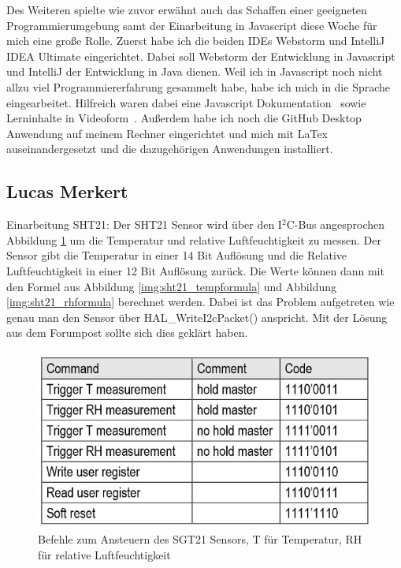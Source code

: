 \documentclass[]{article}
\begin{document}
Des Weiteren spielte wie zuvor erwähnt auch das Schaffen einer geeigneten Programmierumgebung samt der Einarbeitung in Javascript diese Woche für mich eine große Rolle. Zuerst habe ich die beiden IDEs Webstorm und IntelliJ IDEA Ultimate eingerichtet. Dabei soll Webstorm der Entwicklung in Javascript und IntelliJ der Entwicklung in Java dienen. Weil ich in Javascript noch nicht allzu viel Programmiererfahrung gesammelt habe, habe ich mich in die Sprache eingearbeitet. Hilfreich waren dabei eine Javascript Dokumentation~\cite{JS_docu} sowie Lerninhalte in Videoform~\cite{javascript_tut}. Außerdem habe ich noch die GitHub Desktop Anwendung auf meinem Rechner eingerichtet und mich mit LaTex auseinandergesetzt und die dazugehörigen Anwendungen installiert.

\subsection{Lucas Merkert}
Einarbeitung SHT21: Der SHT21 Sensor wird über den I$^2$C-Bus angesprochen {Abbildung \ref{img:sht21_commandset}} um die Temperatur und relative Luftfeuchtigkeit zu messen. Der Sensor gibt die Temperatur in einer 14 Bit Auflösung und die Relative Luftfeuchtigkeit in einer 12 Bit Auflösung zurück. Die Werte können dann mit den Formel aus {Abbildung \ref{img:sht21_tempformula}} und {Abbildung \ref{img:sht21_rhformula}} berechnet werden. Dabei ist das Problem aufgetreten wie genau man den Sensor über HAL\_WriteI2cPacket() anspricht. Mit der Lösung aus dem Forumpost sollte sich dies geklärt haben.
\begin{figure}[h]
	\centering
	\includegraphics[scale=0.60]{images/sht21_commandset}
	\caption{Befehle zum Ansteuern des SGT21 Sensors, T für Temperatur, RH für relative Luftfeuchtigkeit~\cite{datasheetsht21}}
	\label{img:sht21_commandset}
\end{figure}
\end{document}
